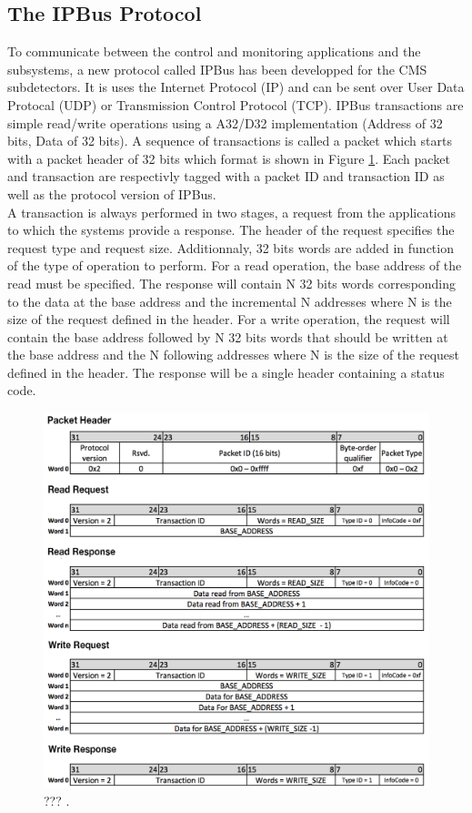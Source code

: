     \subsection{The IPBus Protocol}

      To communicate between the control and monitoring applications and the subsystems, a new protocol called IPBus has been developped for the CMS subdetectors. It is uses the Internet Protocol (IP) and can be sent over User Data Protocal (UDP) or Transmission Control Protocol (TCP). IPBus transactions are simple read/write operations using a A32/D32 implementation (Address of 32 bits, Data of 32 bits). A sequence of transactions is called a packet which starts with a packet header of 32 bits which format is shown in Figure \ref{fig:II-2-daq-ipbus}. Each packet and transaction are respectivly tagged with a packet ID and transaction ID as well as the protocol version of IPBus. \\

      A transaction is always performed in two stages, a request from the applications to which the systems provide a response. The header of the request specifies the request type and request size. Additionnaly, 32 bits words are added in function of the type of operation to perform. For a read operation, the base address of the read must be specified. The response will contain N 32 bits words corresponding to the data at the base address and the incremental N addresses where N is the size of the request defined in the header. For a write operation, the request will contain the base address followed by N 32 bits words that should be written at the base address and the N following addresses where N is the size of the request defined in the header. The response will be a single header containing a status code.

      \begin{figure}[h!]
        \centering
        \includegraphics[width=\textwidth]{img/II-2-daq/ipbus.png}
        \caption{??? \cite{AMC13}.}
        \label{fig:II-2-daq-ipbus}
      \end{figure}

